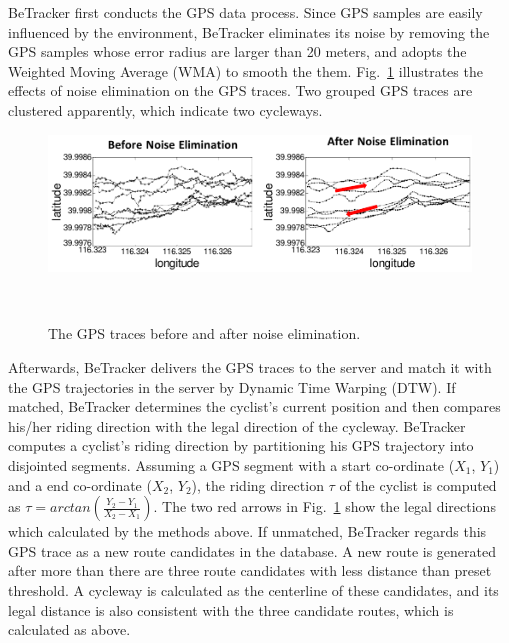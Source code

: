 \documentclass{sigchi-ext}
\def\sysname{BeTracker }
\begin{document}
\sysname first conducts the GPS data process. Since GPS samples are easily influenced by the environment, \sysname eliminates its noise by removing the GPS samples whose error radius are larger than 20 meters, and adopts the Weighted Moving Average (WMA) to smooth the them.  Fig.~\ref{fig:gps_trace} illustrates the effects of noise elimination on the GPS traces. Two grouped GPS traces are clustered apparently, which indicate two cycleways. 



\begin{figure}[h]
	\includegraphics[width=1\columnwidth]{figures/GPS_trace1.pdf}
	\caption{The GPS traces before and after noise elimination.}~\label{fig:gps_trace}
\end{figure}

Afterwards, \sysname delivers the GPS traces to the server and match it with the GPS trajectories in the server by Dynamic Time Warping (DTW). If matched, \sysname determines the cyclist's current position and then compares his/her riding direction with the legal direction of the cycleway.  \sysname computes a cyclist's riding direction by partitioning his GPS trajectory into disjointed segments. Assuming a GPS segment with a start co-ordinate ($X_{1}$, $Y_{1}$) and a end co-ordinate ($X_{2}$, $Y_{2}$), the riding direction $\tau$ of the cyclist is computed as $\tau=arctan(\frac{Y_{2}-Y_{1}}{X_{2}-X_{1}})$.  The two red arrows in Fig.~\ref{fig:gps_trace} show the legal directions which calculated by the methods above.  
If unmatched, \sysname regards this GPS trace as a new route candidates in the database. A new route is generated after more than there are three route candidates with less distance than preset threshold. A cycleway is calculated as the centerline of these candidates, and its legal distance is also consistent with the three candidate routes, which is calculated as above.  
\end{document}
